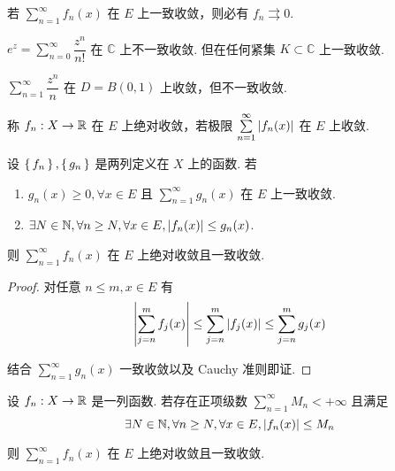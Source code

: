 \begin{inference}
    若 $\sum\limits_{n=1}^\infty f_n(x)$ 在 $E$ 上一致收敛，则必有 $f_n\rightrightarrows 0$.
\end{inference}

\begin{example}
    $e^z=\sum\limits_{n=0}^\infty\dfrac{z^n}{n!}$ 在 $\mathbb{C}$ 上不一致收敛. 但在任何紧集 $K\subset\mathbb{C}$ 上一致收敛.
\end{example}

\begin{example}
    $\sum\limits_{n=1}^\infty\dfrac{z^n}{n}$ 在 $D=B(0,1)$ 上收敛，但不一致收敛.
\end{example}


\begin{definition}
    称 $f_n:X\to\mathbb{R}$ 在 $E$ 上绝对收敛，若极限 $\sum\limits_{n=1}^\infty\left\lvert{f_n(x)}\right\rvert$ 在 $E$ 上收敛.
\end{definition}

\begin{property}
    设 $\set{f_n},\set{g_n}$ 是两列定义在 $X$ 上的函数. 若

    \begin{enumerate}
        \item $g_n(x)\ge 0,\forall x\in E$ 且 $\sum\limits_{n=1}^\infty g_n(x)$ 在 $E$ 上一致收敛.
        
        \item $\exists N\in\mathbb{N},\forall n\ge N,\forall x\in E,\left\lvert{f_n(x)}\right\rvert\le g_n(x)$.
    \end{enumerate}

    则 $\sum\limits_{n=1}^\infty f_n(x)$ 在 $E$ 上绝对收敛且一致收敛.
\end{property}
\begin{proof}
    对任意 $n\le m,x\in E$ 有
$$
\left\lvert{\sum_{j=n}^mf_j(x)}\right\rvert\le\sum_{j=n}^m\left\lvert{f_j(x)}\right\rvert\le\sum_{j=n}^mg_j(x)
$$

    结合 $\sum\limits_{n=1}^\infty g_n(x)$ 一致收敛以及 Cauchy 准则即证.
\end{proof}

\begin{inference}
    设 $f_n:X\to\mathbb{R}$ 是一列函数. 若存在正项级数 $\sum\limits_{n=1}^\infty M_n<+\infty$ 且满足
$$
\exists N\in\mathbb{N},\forall n\ge N,\forall x\in E,\left\lvert{f_n(x)}\right\rvert\le M_n
$$

    则 $\sum\limits_{n=1}^\infty f_n(x)$ 在 $E$ 上绝对收敛且一致收敛.
\end{inference}

